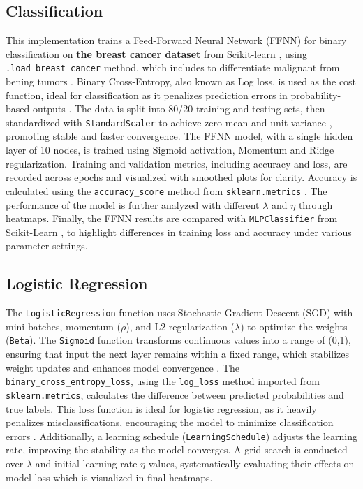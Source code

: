 \documentclass{article}
\newcommand{\0}{\mathbf{0}}
\newcommand{\1}{\mathbf{1}}
\begin{document}
\subsection{Classification}
This implementation trains a Feed-Forward Neural Network (FFNN) for binary classification on \textbf{the breast cancer dataset} from Scikit-learn \cite{pedregosa2011scikit}, using \texttt{.load\_breast\_cancer} method, which includes to differentiate malignant from bening tumors \cite{breast}. Binary Cross-Entropy, also known as Log loss,  is used as the cost function, ideal for classification as it penalizes prediction errors in probability-based outputs \cite{logloss}. The data  is split into 80/20 training and testing sets, then standardized with \texttt{StandardScaler} to achieve zero mean and unit variance \cite{pedregosa2011scikit}, promoting stable and faster convergence. The FFNN model, with a single hidden layer of 10 nodes, is trained using Sigmoid activation, Momentum and Ridge regularization. Training and validation metrics, including accuracy and loss, are recorded across epochs and visualized with smoothed plots for clarity. Accuracy is calculated using the \texttt{accuracy\_score} method from \texttt{sklearn.metrics} \cite{pedregosa2011scikit}. The performance of the model is further analyzed with different \(\lambda\) and \(\eta\) through heatmaps. Finally, the FFNN results are compared with \texttt{MLPClassifier} from Scikit-Learn \cite{pedregosa2011scikit}, to highlight differences in training loss and accuracy under various parameter settings. 

\subsection{Logistic Regression}
The \texttt{LogisticRegression} function uses Stochastic Gradient Descent (SGD) with mini-batches, momentum (\(\rho\)), and L2 regularization (\(\lambda\)) to optimize the weights (\texttt{Beta}). The \texttt{Sigmoid} function transforms continuous values into a range of (0,1), ensuring that input the next layer remains within a fixed range, which stabilizes weight updates and enhances model convergence \cite{AsiRah}. The \texttt{binary\_cross\_entropy\_loss}, using the \texttt{log\_loss} method imported from \texttt{sklearn.metrics}\cite{pedregosa2011scikit}, calculates the difference between predicted probabilities and true labels. This loss function is ideal for logistic regression, as it heavily penalizes misclassifications, encouraging the model to minimize classification errors \cite{Data_science}. Additionally, a learning schedule (\texttt{LearningSchedule}) adjusts the learning rate, improving the stability as the model converges. A grid search is conducted over \(\lambda\) and initial learning rate \(\eta\) values, systematically evaluating their effects on model loss which is visualized in final heatmaps.
\end{document}
